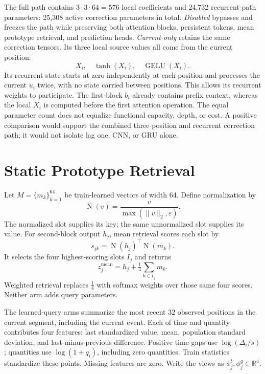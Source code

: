 \documentclass[runningheads]{llncs}
\newcommand{\Nrm}{\operatorname{N}}
\begin{document}
The full path contains $3\cdot3\cdot64=576$ local
coefficients and 24,732 recurrent-path parameters:
25,308 active correction parameters in total.
\emph{Disabled} bypasses and freezes the path while
preserving both attention blocks, persistent tokens,
mean prototype retrieval, and prediction heads.
\emph{Current-only} retains the same correction
tensors. Its three local source values all come
from the current position:
\[X_i,\quad\tanh(X_i),\quad\operatorname{GELU}(X_i).\]
Its recurrent state starts at zero independently at
each position and processes the current $u_i$ twice,
with no state carried between positions.
This allows its recurrent weights to participate.
The first-block $b_i$ already contains prefix context,
whereas the local $X_i$ is computed before the first
attention operation. The equal parameter count does
not equalize functional capacity, depth, or cost.
A positive comparison would support the combined
three-position and recurrent correction path; it
would not isolate lag one, CNN, or GRU alone.

\section{Static Prototype Retrieval}
Let $M=\{m_k\}_{k=1}^{64}$ be train-learned
vectors of width 64. Define normalization by
\[\Nrm(v)=\frac{v}{\max(\|v\|_2,\varepsilon)}.\]
The normalized slot supplies its key; the same
unnormalized slot supplies its value. For second-block
output $h_j$, mean retrieval scores each slot by
\[s_{jk}=\Nrm(h_j)^\top\Nrm(m_k).\]
It selects the four highest-scoring slots $I_j$
and returns
\begin{equation}
 z_j^{\mathrm{mean}}=
 h_j+\tfrac14\sum_{k\in I_j}m_k .
 \label{eq:mean}
\end{equation}
Weighted retrieval replaces $\tfrac14$ with softmax
weights over those same four scores. Neither arm adds
query parameters.

The learned-query arms summarize the most recent
32 observed positions in the current segment, including
the current event. Each of time and quantity contributes
four features: last standardized value, mean,
population standard deviation, and last-minus-previous
difference. Positive time gaps use $\log(\Delta_i/s)$;
quantities use $\log(1+q_i)$, including zero quantities.
Train statistics standardize these points. Missing
features are zero. Write the views as
$\phi_j^t,\phi_j^q\in\mathbb R^4$.
\end{document}
